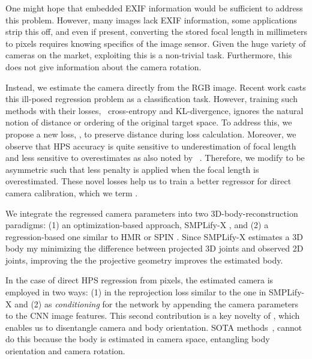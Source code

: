 \documentclass[10pt,twocolumn,letterpaper,usenames,dvipsnames]{article}
\begin{document}
One might hope that  embedded EXIF information would be sufficient to address this problem.
However, many images lack EXIF information, some applications strip this off, and even if present, converting the stored focal length in millimeters to pixels requires knowing specifics of the image sensor.
Given the huge variety of cameras on the market, exploiting this is a non-trivial task.
Furthermore, this does not give information about the camera rotation. 

Instead, we estimate the camera directly from the RGB image.
Recent work \cite{Hold-Geoffroy_2018_CVPR,Kendall_2015_ICCV,workman2016horizon,zhu2020single} casts this ill-posed regression problem as a classification task.
However, training such methods with their losses, \eg~cross-entropy and KL-divergence, 
ignores the natural notion of distance or ordering of the original target space.
To address this, we propose a new loss, \softltwo, to preserve distance during loss calculation. Moreover, we observe that HPS accuracy is quite sensitive to underestimation of focal length and less sensitive to overestimates as also noted by ~\cite{kissosECCVW2020,yu2020pcls}. Therefore, we modify \softltwo to be asymmetric such that less penalty is applied when the focal length is overestimated. These novel losses help us to train a better regressor for direct camera calibration, which we term \emph{\camcalib}.

We integrate the regressed camera parameters into two 3D-body-reconstruction paradigms: (1) an optimization-based approach, SMPLify-X \cite{SMPL-X:2019}, and (2) a regression-based one similar to HMR or SPIN \cite{kanazawa_hmr,SPIN:ICCV:2019}.
Since SMPLify-X estimates a 3D body my minimizing the difference between projected 3D joints and observed 2D joints, improving the the projective geometry improves the estimated body.

In the case of direct HPS regression from pixels, the estimated camera is employed in two ways: (1) in the reprojection loss similar to the one in SMPLify-X and (2) as {\em conditioning} for the network by appending the camera parameters to the CNN image features.
This second contribution is a key novelty of \methodname, which enables us to disentangle camera and body orientation. SOTA methods~\cite{PARE_2021, SPIN:ICCV:2019, kocabas2019vibe, CenterHMR}, cannot do this because the body is estimated in camera space, entangling body orientation and camera rotation.
\end{document}
